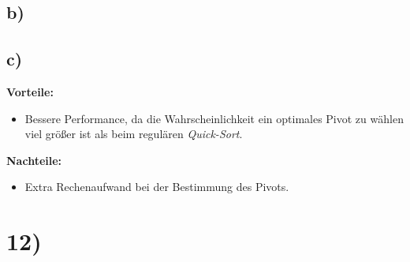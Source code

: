 \documentclass[11pt,a4paper]{article}
\begin{document}
    \subsection*{b)}
      
      
    \subsection*{c)}
    
      \textbf{Vorteile:}
      \begin{itemize}
      	\item Bessere Performance, da die Wahrscheinlichkeit ein optimales Pivot zu wählen viel größer ist als beim regulären \textit{Quick-Sort}.
      \end{itemize}
      \textbf{Nachteile:}
      \begin{itemize}
      	\item Extra Rechenaufwand bei der Bestimmung des Pivots.
      \end{itemize}
  
  \newpage
  \section*{12)}
  
\end{document}
